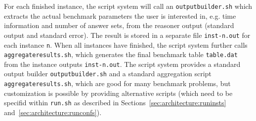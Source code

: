 \documentclass[a4paper]{article}
\begin{document}
		For each finished instance, the script system will call an {\tt outputbuilder.sh}
		which extracts the actual benchmark parameters the user is interested in,
		e.g. time information and number of answer sets,
		from the reasoner output (standard output and standard error).
		The result is stored in a separate file {\tt inst-n.out} for each instance {\tt n}.
		When all instances have finished, the script system further calls {\tt aggregateresults.sh},
		which generates the final benchmark table {\tt table.dat} from the instance outputs {\tt inst-n.out}.
		The script system provides a standard output builder {\tt outputbuilder.sh} and a standard aggregation script {\tt aggregateresults.sh},
		which are good for many benchmark problems, but customization is possible by providing alternative scripts
		(which need to be specifid within {\tt run.sh} as described in Sections~\ref{sec:architecture:runinsts} and~\ref{sec:architecture:runconfs}).
\end{document}
